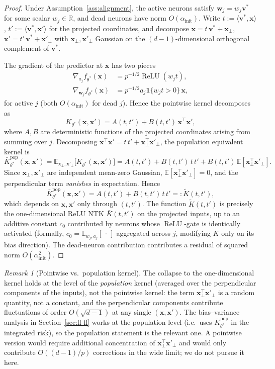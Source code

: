 \documentclass[12pt]{amsart}
\theoremstyle{definition}
\theoremstyle{remark}
\newtheorem{remark}[theorem]{Remark}
\DeclareMathOperator{\relu}{ReLU}
\newcommand{\R}{\mathbb{R}}
\newcommand{\E}{\mathbb{E}}
\newcommand{\bx}{\mathbf{x}}
\newcommand{\bv}{\mathbf{v}}
\newcommand{\bw}{\mathbf{w}}
\begin{document}
\begin{proof}
Under Assumption~\ref{ass:alignment}, the active neurons satisfy
$\bw_{j} = w_{j}\bv^{*}$ for some scalar $w_{j} \in \R$, and dead
neurons have norm $O(\alpha_{\mathrm{init}})$. Write
$t := \langle\bv^{*},\bx\rangle$, $t' := \langle\bv^{*},\bx'\rangle$
for the projected coordinates, and decompose
$\bx = t\,\bv^{*} + \bx_{\perp}$, $\bx' = t'\,\bv^{*} + \bx'_{\perp}$
with $\bx_{\perp},\bx'_{\perp}$ Gaussian on the $(d-1)$-dimensional
orthogonal complement of $\bv^{*}$.

The gradient of the predictor at $\bx$ has two pieces
\begin{align*}
  \nabla_{a_{j}} f_{\theta^{*}}(\bx)
    &= p^{-1/2} \relu(w_{j} t), \\
  \nabla_{\bw_{j}} f_{\theta^{*}}(\bx)
    &= p^{-1/2} a_{j} \mathbf{1}\{w_{j} t > 0\}\,\bx,
\end{align*}
for active $j$ (both $O(\alpha_{\mathrm{init}})$ for dead $j$). Hence
the pointwise kernel decomposes as
\[
  K_{\theta^{*}}(\bx,\bx') = A(t,t') + B(t,t')\,\bx^{\top}\bx',
\]
where $A,B$ are deterministic functions of the projected coordinates
arising from summing over $j$. Decomposing
$\bx^{\top}\bx' = t\,t' + \bx_{\perp}^{\top}\bx'_{\perp}$, the population
equivalent kernel is
\[
  \bar K^{\mathrm{pop}}_{\theta^{*}}(\bx,\bx')
  = \E_{\bx_{\perp},\bx'_{\perp}}\!\bigl[K_{\theta^{*}}(\bx,\bx')\bigr]
  = A(t,t') + B(t,t')\,t\,t'
    + B(t,t')\,\E[\bx_{\perp}^{\top}\bx'_{\perp}].
\]
Since $\bx_{\perp},\bx'_{\perp}$ are independent mean-zero Gaussian,
$\E[\bx_{\perp}^{\top}\bx'_{\perp}] = 0$, and the perpendicular term
\emph{vanishes} in expectation. Hence
\[
  \bar K^{\mathrm{pop}}_{\theta^{*}}(\bx,\bx')
  = A(t,t') + B(t,t')\,t\,t'
  =: \tilde K(t,t'),
\]
which depends on $\bx,\bx'$ only through $(t,t')$. The function
$\tilde K(t,t')$ is precisely the one-dimensional ReLU NTK $\bar K(t,t')$
on the projected inputs, up to an additive constant $c_{0}$ contributed
by neurons whose $\relu$-gate is identically activated (formally,
$c_{0} = \E_{w_{j},a_{j}}[\,\cdot\,]$ aggregated across $j$, modifying
$\bar K$ only on its bias direction). The dead-neuron contribution
contributes a residual of squared norm $O(\alpha_{\mathrm{init}}^{2})$.
\end{proof}

\begin{remark}[Pointwise vs.\ population kernel]\label{rem:pop-kernel}
The collapse to the one-dimensional kernel holds at the level of the
\emph{population} kernel (averaged over the perpendicular components of
the inputs), not the pointwise kernel: the term
$\bx_{\perp}^{\top}\bx'_{\perp}$ is a random quantity, not a constant, and
the perpendicular components contribute fluctuations of order
$O(\sqrt{d-1})$ at any single $(\bx,\bx')$. The bias--variance analysis in
Section~\ref{sec:fl-fl} works at the population level (i.e.\ uses
$\bar K^{\mathrm{pop}}_{\theta^{*}}$ in the integrated risk), so the
population statement is the relevant one. A pointwise version would
require additional concentration of $\bx_{\perp}^{\top}\bx'_{\perp}$ and
would only contribute $O((d-1)/p)$ corrections in the wide limit; we do
not pursue it here.
\end{remark}
\end{document}
